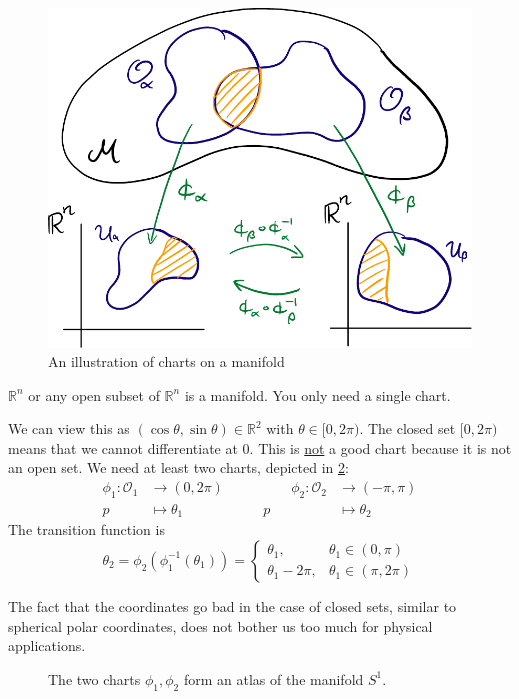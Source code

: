 \begin{figure}[tbhp]
  \centering
  \includegraphics[width=0.5\linewidth]{lectures/F1.pdf}
  \caption{An illustration of charts on a manifold}
  \label{fig:manifold}
\end{figure}

\begin{example}[$\mathbb{R}^n$]
  $\mathbb{R}^n$ or any open subset of $\mathbb{R}^n$ is a manifold. You only need a single chart.
\end{example}

\begin{example}[$S^1$]
  We can view this as $(\cos \theta, \sin \theta) \in \mathbb{R}^{2}$ with $\theta \in [0, 2\pi)$. The closed set $[0, 2\pi)$ means that we cannot differentiate at $0$. This is \underline{not} a good chart because it is not an open set. 
  We need at least two charts, depicted in \ref{fig:L1F2}:
  \begin{equation}
    \begin{alignedat}{2}
      \phi_1 \colon \mathcal{O}_1 &\to (0, 2\pi)  \qquad&\qquad
      \phi_2 \colon \mathcal{O}_2 &\to (-\pi, \pi) \\
      p &\mapsto \theta_1 &
      p &\mapsto \theta_2
    \end{alignedat}
  \end{equation}
  The transition function is 
  \begin{equation}
    \theta_2 = \phi_2(\phi_1^{-1}(\theta_1)) = 
    \begin{cases}
      \theta_1, & \theta_1 \in (0, \pi) \\
      \theta_1 - 2\pi, & \theta_1 \in (\pi, 2\pi)
    \end{cases}
  \end{equation}
\begin{leftbar}
  \begin{remark}
    The fact that the coordinates go bad in the case of closed sets, similar to spherical polar coordinates, does not bother us too much for physical applications.
  \end{remark}
\end{leftbar}
\end{example}
\begin{figure}[htpb]
  \centering
  \def\svgwidth{0.7\columnwidth}
  
  \caption{The two charts $\phi_1, \phi_2$ form an atlas of the manifold $S^1$.}
  \label{fig:L1F2}
\end{figure}

